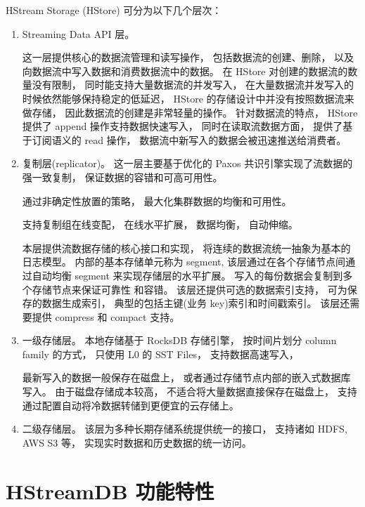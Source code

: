 \documentclass{ctexart}
\begin{document}
HStream Storage (HStore) 可分为以下几个层次：
\begin{enumerate}
    \item Streaming Data API 层。
       
      这一层提供核心的数据流管理和读写操作，
      包括数据流的创建、删除，
      以及向数据流中写入数据和消费数据流中的数据。
      在 HStore 对创建的数据流的数量没有限制，
      同时能支持大量数据流的并发写入，
      在大量数据流并发写入的时候依然能够保持稳定的低延迟，
      HStore 的存储设计中并没有按照数据流来做存储，
      因此数据流的创建是非常轻量的操作。
      针对数据流的特点，
      HStore 提供了 append 操作支持数据快速写入，
      同时在读取流数据方面，
      提供了基于订阅语义的 read 操作，
      数据流中新写入的数据会被迅速推送给消费者。

    \item 复制层(replicator)。
     这一层主要基于优化的 Paxos 共识引擎实现了流数据的强一致复制，
     保证数据的容错和可高可用性。

     通过非确定性放置的策略，
     最大化集群数据的均衡和可用性。

     支持复制组在线变配，
     在线水平扩展，
     数据均衡，
     自动伸缩。

     本层提供流数据存储的核心接口和实现，
     将连续的数据流统一抽象为基本的日志模型。
     内部的基本存储单元称为 segment,
     该层通过在各个存储节点间通过自动均衡 segment
     来实现存储层的水平扩展。
     写入的每份数据会复制到多个存储节点来保证可靠性
     和容错。
     该层还提供可选的数据索引支持，
     可为保存的数据生成索引，
     典型的包括主键(业务 key)索引和时间戳索引。
     该层还需要提供 compress 和 compact 支持。
    \item 一级存储层。
      本地存储基于 RocksDB 存储引擎，
      按时间片划分 column family 的方式，
      只使用 L0 的 SST Files，
      支持数据高速写入，

      最新写入的数据一般保存在磁盘上，
      或者通过存储节点内部的嵌入式数据库写入。
      由于磁盘存储成本较高，
      不适合将大量数据直接保存在磁盘上，
      支持通过配置自动将冷数据转储到更便宜的云存储上。
    \item 二级存储层。
        该层为多种长期存储系统提供统一的接口，
        支持诸如 HDFS, AWS S3 等，
        实现实时数据和历史数据的统一访问。
\end{enumerate}

\section{HStreamDB 功能特性}
\end{document}
